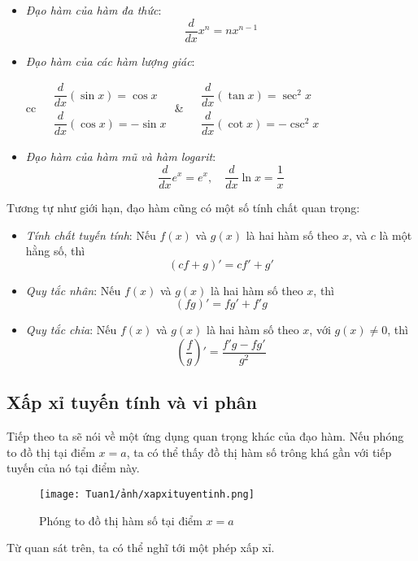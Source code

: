 \begin{itemize}
\item\textit{Đạo hàm của hàm đa thức}:
\begin{equation}
    \frac{d}{dx}x^n=nx^{n-1}
\end{equation}
\item\textit{Đạo hàm của các hàm lượng giác}:
\begin{center}
\begin{tabular}{cc}
\(
\begin{aligned}
    &\dfrac{d}{dx}(\sin x)=\cos x\\
    &\dfrac{d}{dx}(\cos x)=-\sin x
\end{aligned}
\)
&
\(
\begin{aligned}
    &\dfrac{d}{dx}(\tan x)=\sec^2 x\\
    &\dfrac{d}{dx}(\cot x)=-\csc^2 x
\end{aligned}
\)
\end{tabular}
\end{center}
\item\textit{Đạo hàm của hàm mũ và hàm logarit}:
\begin{equation}
    \frac{d}{dx}e^x=e^x,\quad \frac{d}{dx}\ln x=\frac{1}{x}
\end{equation}
\end{itemize}

Tương tự như giới hạn, đạo hàm cũng có một số tính chất quan trọng:
\begin{itemize}
    \item \textit{Tính chất tuyến tính}: Nếu $f(x)$ và $g(x)$ là hai hàm số theo $x$, và $c$ là một hằng số, thì
    \begin{equation}
        (cf+g)'=cf'+g'
    \end{equation}
    \item \textit{Quy tắc nhân}: Nếu $f(x)$ và $g(x)$ là hai hàm số theo $x$, thì
    \begin{equation}
        (fg)'=fg'+f'g
    \end{equation}
    \item \textit{Quy tắc chia}: Nếu $f(x)$ và $g(x)$ là hai hàm số theo $x$, với $g(x)\neq 0$, thì
    \begin{equation}
        \left(\frac{f}{g}\right)'=\frac{f'g-fg'}{g^2}
    \end{equation}
\end{itemize}
\subsection{Xấp xỉ tuyến tính và vi phân}
Tiếp theo ta sẽ nói về một ứng dụng quan trọng khác của đạo hàm. Nếu phóng to đồ thị tại điểm $x=a$, ta có thể thấy đồ thị hàm số trông khá gần với tiếp tuyến của nó tại điểm này.
\begin{figure}[H]
\centering
\texttt{[image: Tuan1/ảnh/xapxituyentinh.png]}
\caption{Phóng to đồ thị hàm số tại điểm $x=a$}
\end{figure}
Từ quan sát trên, ta có thể nghĩ tới một phép xấp xỉ.

